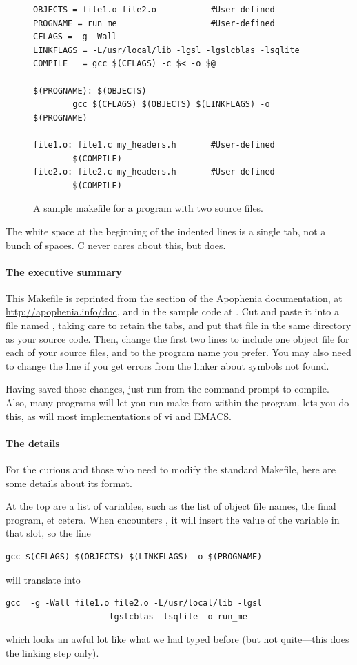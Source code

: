 \documentclass[12pt]{article}
\def\ind#1{\index{#1}#1}
\begin{document}
\begin{figure}
\begin{verbatim}
OBJECTS = file1.o file2.o           #User-defined
PROGNAME = run_me                   #User-defined
CFLAGS = -g -Wall
LINKFLAGS = -L/usr/local/lib -lgsl -lgslcblas -lsqlite
COMPILE   = gcc $(CFLAGS) -c $< -o $@

$(PROGNAME): $(OBJECTS)
        gcc $(CFLAGS) $(OBJECTS) $(LINKFLAGS) -o $(PROGNAME)

file1.o: file1.c my_headers.h       #User-defined
        $(COMPILE)
file2.o: file2.c my_headers.h       #User-defined
        $(COMPILE)
\end{verbatim}
\caption{A sample makefile for a program with two source files.}
\label{makefig}
\end{figure}

The white space at the beginning of the indented lines is a single tab,
not a bunch of spaces.  C never cares about this, but 
does.

\paragraph{The executive summary} This Makefile is reprinted from the 
section of the Apophenia documentation, at
\url{http://apophenia.info/doc}, and in the sample code at 
\samplecodelocation. Cut and paste it into a file named
, taking care to retain the tabs, and put that file in
the same directory as your source code. Then, change the first two lines
to include one object file for each of your source files, and
to the program name you prefer.  You may also need to change the
 line if you get errors from the linker about symbols
not found.

Having saved those changes, just run
 from the command prompt to compile.
Also, many programs will let you run
make from within the program.  lets you do this,
as will most implementations of \ind{vi} and \ind{EMACS}.


\paragraph{The details} For the curious and those who need to modify
the standard Makefile, here are some details about its format.

At the top are a list of variables, such as the list of object file names, the final program, et cetera.
When  encounters , it will insert the value of the variable  in that
slot, so the line 
\begin{lstlisting}
gcc $(CFLAGS) $(OBJECTS) $(LINKFLAGS) -o $(PROGNAME)
\end{lstlisting}
will translate into
\begin{lstlisting}
gcc  -g -Wall file1.o file2.o -L/usr/local/lib -lgsl 
                    -lgslcblas -lsqlite -o run_me
\end{lstlisting}
which looks an awful lot like what we had typed before (but not quite---this does the linking step only).
\end{document}
